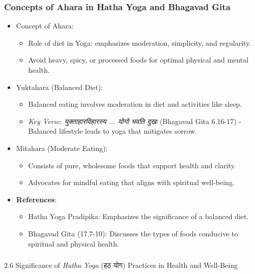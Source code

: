 \begin{frame}[fragile]\frametitle{Concepts of Ahara in Hatha Yoga and Bhagavad Gita}

\begin{itemize}
    \item Concept of Ahara:
        \begin{itemize}
            \item Role of diet in Yoga: emphasizes moderation, simplicity, and regularity.
            \item Avoid heavy, spicy, or processed foods for optimal physical and mental health.
        \end{itemize}
    \item Yuktahara (Balanced Diet):
        \begin{itemize}
            \item Balanced eating involves moderation in diet and activities like sleep.
            \item \textit{Key Verse}: \textit{युक्ताहारविहारस्य ... योगो भवति दुखः} (Bhagavad Gita 6.16-17) - Balanced lifestyle leads to yoga that mitigates sorrow.
        \end{itemize}
    \item Mitahara (Moderate Eating):
        \begin{itemize}
            \item Consists of pure, wholesome foods that support health and clarity.
            \item Advocates for mindful eating that aligns with spiritual well-being.
        \end{itemize}
\end{itemize}
\begin{itemize}
    \item \textbf{References}:
        \begin{itemize}
            \item Hatha Yoga Pradipika: Emphasizes the significance of a balanced diet.
            \item Bhagavad Gita (17.7-10): Discusses the types of foods conducive to spiritual and physical health.
        \end{itemize}
\end{itemize}

\end{frame}

\begin{frame}[fragile]\frametitle{}
\begin{center}
{\Large 2.6  Significance of \textit{Hatha Yoga} (हठ योग) Practices in Health and Well-Being}
\end{center}
\end{frame}

